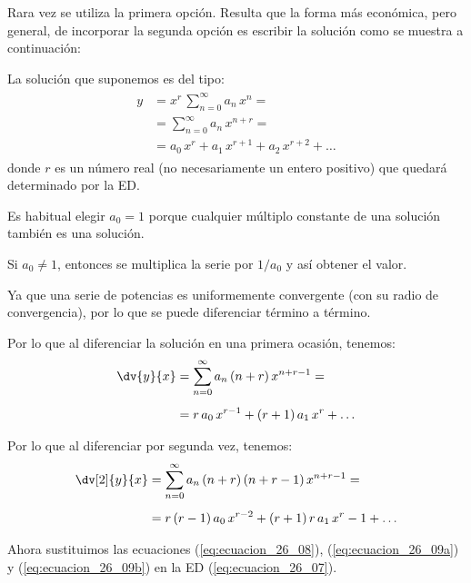 Rara vez se utiliza la primera opción. Resulta que la forma más económica, pero general, de incorporar la segunda opción es escribir la solución como se muestra a continuación:

La solución que suponemos es del tipo:
\begin{align}
\begin{aligned}
y &= x^{r} \, \sum_{n=0}^{\infty} a_{n} \, x^{n} = \\[0.5em]
&= \sum_{n=0}^{\infty} a_{n} \, x^{n+r} = \\[0.5em]
&= a_{0} \, x^{r} + a_{1} \, x^{r+1} + a_{2} \, x^{r+2} + \ldots
\end{aligned}
\label{eq:ecuacion_26_08}    
\end{align}
donde $r$ es un número real (no necesariamente un entero positivo) que quedará determinado por la ED.

Es habitual elegir $a_{0} = 1$ porque cualquier múltiplo constante de una solución también es una solución.

Si $a_{0} \neq 1$, entonces se multiplica la serie por $1/a_{0}$ y así obtener el valor.

Ya que una serie de potencias es uniformemente convergente (con su radio de convergencia), por lo que se puede diferenciar término a término.

Por lo que al diferenciar la solución en una primera ocasión, tenemos:
\begin{align}
\begin{aligned}
\dv{y}{x} &= \sum_{n=0}^{\infty} a_{n} \, (n + r) \, x^{n+r-1} = \\[0.5em]
&= r \, a_{0} \, x^{r-1} + (r + 1) \, a_{1} \, x^{r} + \ldots
\end{aligned}
\label{eq:ecuacion_26_09a}
\end{align}

Por lo que al diferenciar por segunda vez, tenemos:
\begin{align}
\begin{aligned}
\dv[2]{y}{x} &= \sum_{n=0}^{\infty} a_{n} \, (n + r) \, (n + r - 1) \, x^{n+r-1} = \\[0.5em]
&= r \, (r - 1) \, a_{0} \, x^{r-2} + (r + 1) \, r \, a_{1} \, x^{r}-1 + \ldots
\end{aligned}
\label{eq:ecuacion_26_09b}
\end{align}

Ahora sustituimos las ecuaciones (\ref{eq:ecuacion_26_08}), (\ref{eq:ecuacion_26_09a}) y (\ref{eq:ecuacion_26_09b}) en la ED (\ref{eq:ecuacion_26_07}).

